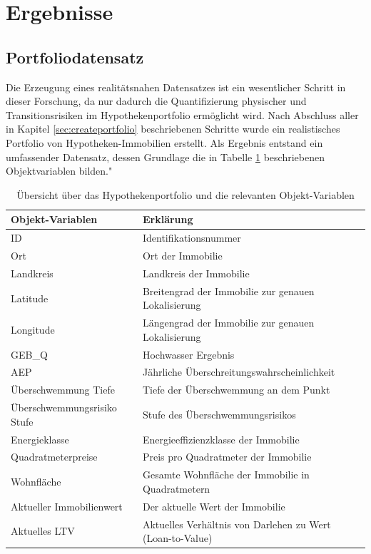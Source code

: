 \section{Ergebnisse}
\subsection{Portfoliodatensatz}
Die Erzeugung eines realitätsnahen Datensatzes ist ein wesentlicher Schritt in dieser Forschung, da nur dadurch die Quantifizierung physischer und Transitionsrisiken im Hypothekenportfolio ermöglicht wird. Nach Abschluss aller in Kapitel \ref{sec:createportfolio} beschriebenen Schritte wurde ein realistisches Portfolio von Hypotheken-Immobilien erstellt. Als Ergebnis entstand ein umfassender Datensatz, dessen Grundlage die in Tabelle \ref{tab:objekt-variablen} beschriebenen Objektvariablen bilden."
\begin{table}[htbp]
    \centering
    \small
    \caption{Übersicht über das Hypothekenportfolio und die relevanten Objekt-Variablen}
    \label{tab:objekt-variablen}
    \begin{tabularx}{1.0\textwidth}{>{\raggedright\arraybackslash}X >{\raggedright\arraybackslash}X}
        \toprule
        \textbf{Objekt-Variablen} & \textbf{Erklärung} \\
        \midrule
        ID & Identifikationsnummer \\
        \addlinespace
        Ort & Ort der Immobilie \\
        \addlinespace
        Landkreis & Landkreis der Immobilie \\
        \addlinespace
        Latitude & Breitengrad der Immobilie zur genauen Lokalisierung \\
        \addlinespace
        Longitude & Längengrad der Immobilie zur genauen Lokalisierung \\
        \addlinespace
        GEB\_Q & Hochwasser Ergebnis \\
        \addlinespace
        AEP & Jährliche Überschreitungswahrscheinlichkeit \\
        \addlinespace
        Überschwemmung Tiefe & Tiefe der Überschwemmung an dem Punkt \\
        \addlinespace
        Überschwemmungsrisiko Stufe & Stufe des Überschwemmungsrisikos \\
        \addlinespace
        Energieklasse & Energieeffizienzklasse der Immobilie \\
        \addlinespace
        Quadratmeterpreise & Preis pro Quadratmeter der Immobilie \\
        \addlinespace
        Wohnfläche & Gesamte Wohnfläche der Immobilie in Quadratmetern \\
        \addlinespace
        Aktueller Immobilienwert & Der aktuelle Wert der Immobilie \\
        \addlinespace        Aktuelles LTV & Aktuelles Verhältnis von Darlehen zu Wert (Loan-to-Value) \\
        \bottomrule
    \end{tabularx}
\end{table}
